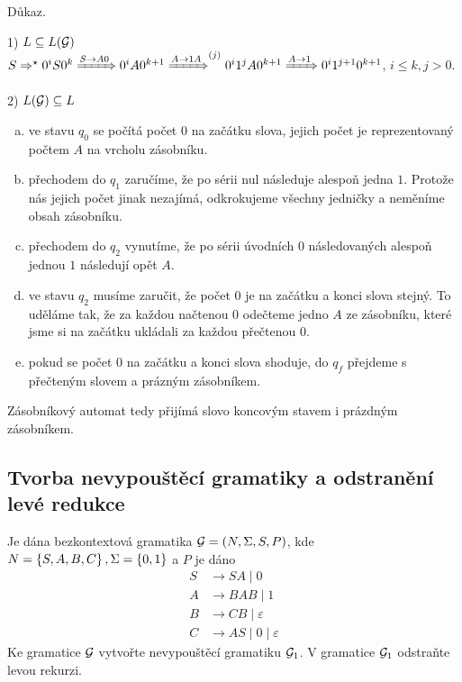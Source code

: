 Důkaz.

1) $L \subseteq L(\mathcal{G})$\\
$S \Rightarrow^\star 0^i S 0^k \xRightarrow{S \rightarrow A0} 0^i A 0^{k+1} \xRightarrow{A \rightarrow 1A}^{(j)}
0^i 1^j A 0^{k+1} \xRightarrow{A \rightarrow 1} 0^i 1^{j+1} 0^{k+1}$, $i \leq k, j > 0$. %

2) $L(\mathcal{G}) \subseteq L$
\begin{enumerate}[(a), noitemsep]
    \item ve stavu $q_0$ se počítá počet $0$ na začátku slova, jejich počet je reprezentovaný počtem $A$ na vrcholu zásobníku.
    \item přechodem do $q_1$ zaručíme, že po sérii nul následuje alespoň jedna $1$. Protože nás jejich počet jinak nezajímá, 
    odkrokujeme všechny jedničky a neměníme obsah zásobníku.
    \item přechodem do $q_2$ vynutíme, že po sérii úvodních $0$ následovaných alespoň jednou $1$ následují opět $A$.
    \item ve stavu $q_2$ musíme zaručit, že počet $0$ je na začátku a konci slova stejný. To uděláme tak, že za každou
    načtenou $0$ odečteme jedno $A$ ze zásobníku, které jsme si na začátku ukládali za každou přečtenou $0$.
    \item pokud se počet $0$ na začátku a konci slova shoduje, do $q_f$ přejdeme s přečteným slovem a prázným zásobníkem.
\end{enumerate}
Zásobníkový automat tedy přijímá slovo koncovým stavem i prázdným zásobníkem.

\subsection{Tvorba nevypouštěcí gramatiky a odstranění levé redukce}
Je dána bezkontextová gramatika $\mathcal{G} = (N, \Sigma, S, P)$, kde $N = \left\lbrace S,A,B,C \right\rbrace, \Sigma = \left\lbrace 0,1 \right\rbrace$ a $P$ je dáno
\begin{align*}
    S &\rightarrow SA \mid 0 \\
    A &\rightarrow BAB \mid 1 \\
    B &\rightarrow CB \mid \varepsilon \\
    C &\rightarrow AS \mid 0 \mid \varepsilon
\end{align*}
Ke gramatice $\mathcal{G}$ vytvořte nevypouštěcí gramatiku $\mathcal{G}_1$. V gramatice $\mathcal{G}_1$ odstraňte levou rekurzi.

